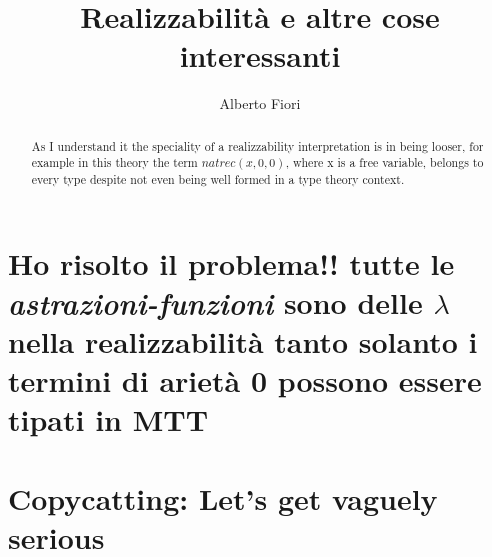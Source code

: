 \documentclass[11pt,a5paper,draft,oneside]{amsbook}
\author{Alberto Fiori}
\title{Realizzabilità e altre cose interessanti}
\theoremstyle{plain}%
\theoremstyle{definition}
\theoremstyle{remark}
\newcommand{\femph}{\textbf}
\begin{document}
\maketitle
\begin{abstract}
	As I understand it the speciality of a 
	realizzability 	interpretation is in 
	being looser, for example in this theory
	the term $natrec(x, 0, 0)$, where x is a free variable, belongs to every type despite not even being well formed in a type theory context.
\end{abstract}

\section{Ho risolto il  problema!! tutte le \emph{astrazioni-funzioni} sono delle $\lambda$ nella realizzabilità tanto solanto i termini di arietà 0 possono essere tipati in \femph{MTT}}

\section{Copycatting: Let's get vaguely serious}
\end{document}
